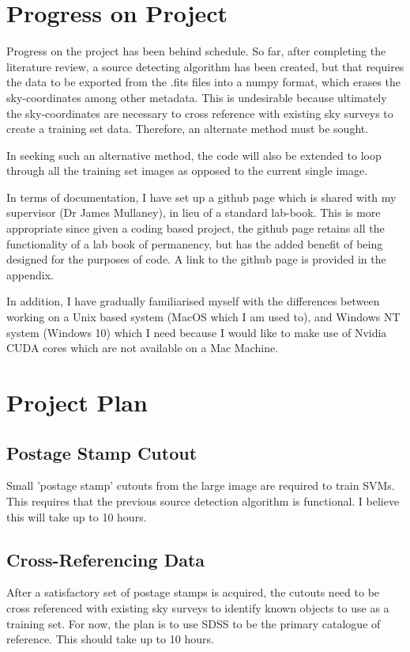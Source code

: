 \documentclass[a4paper,11pt]{article}
\begin{document}
\section{Progress on Project}
Progress on the project has been behind schedule. So far, after completing the literature review, a source detecting algorithm has been created, but that requires the data to be exported from the .fits files into a numpy format, which erases the sky-coordinates among other metadata. This is undesirable because ultimately the sky-coordinates are necessary to cross reference with existing sky surveys to create a training set data. Therefore, an alternate method must be sought. 

In seeking such an alternative method, the code will also be extended to loop through all the training set images as opposed to the current single image. 

In terms of documentation, I have set up a github page which is shared with my supervisor (Dr James Mullaney), in lieu of a standard lab-book. This is more appropriate since given a coding based project, the github page retains all the functionality of a lab book of permanency, but has the added benefit of being designed for the purposes of code. A link to the github page is provided in the appendix.

In addition, I have gradually familiarised myself with the differences between working on a Unix based system (MacOS which I am used to), and Windows NT system (Windows 10) which I need because I would like to make use of Nvidia CUDA cores which are not available on a Mac Machine.

\section{Project Plan}
\subsection{Postage Stamp Cutout}
Small 'postage stamp' cutouts from the large image are required to train SVMs. This requires that the previous source detection algorithm is functional. I believe this will take up to 10 hours. 
\subsection{Cross-Referencing Data}
After a satisfactory set of postage stamps is acquired, the cutouts need to be cross referenced with existing sky surveys to identify known objects to use as a training set. For now, the plan is to use SDSS to be the primary catalogue of reference. This should take up to 10 hours.
\end{document}
